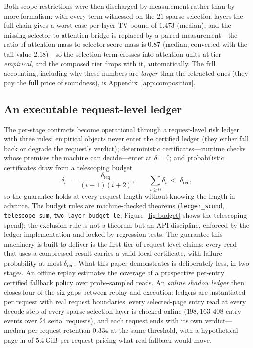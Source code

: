 \documentclass[11pt]{article}
\begin{document}
Both scope restrictions were then discharged by measurement rather than
by more formalism: with every term witnessed on the $21$ sparse-selection
layers the full chain gives a worst-case per-layer TV bound of $1.473$
(median), and the missing selector-to-attention bridge is replaced by a
paired measurement---the ratio of attention mass to selector-score mass is
$0.87$ (median; converted with the tail value $2.18$)---so the selection
term crosses into attention units at tier \emph{empirical}, and the
composed tier drops with it, automatically. The full accounting, including
why these numbers are \emph{larger} than the retracted ones (they pay the
full price of soundness), is Appendix~\ref{app:composition}.

\subsection{An executable request-level ledger}\label{sec:ledger}
The per-stage contracts become operational through a request-level risk ledger with
three rules: empirical objects never enter the certified ledger (they either fall
back or degrade the request's verdict); deterministic certificates---runtime
checks whose premises the machine can decide---enter at $\delta=0$; and
probabilistic certificates draw from a telescoping budget
\begin{equation}
\delta_i \;=\; \frac{\delta_{\mathrm{req}}}{(i{+}1)(i{+}2)},
\qquad \sum_{i\ge 0}\delta_i \;<\; \delta_{\mathrm{req}},
\label{eq:telescope}
\end{equation}
so the guarantee holds at every request length without knowing the
length in advance. The budget rules are machine-checked
theorems (\texttt{ledger\_sound}, \texttt{telescope\_sum},
\texttt{two\_layer\_budget\_le}; Figure~\ref{fig:budget} shows the
telescoping spend); the exclusion rule is not a theorem but an API
discipline, enforced by the ledger implementation and locked by regression tests. The guarantee this machinery is built to deliver is the first tier of
request-level claims: every read that uses a compressed result carries a valid
local certificate, with failure probability at most $\delta_{\mathrm{req}}$. What
this paper demonstrates is deliberately less, in two stages. An offline replay
estimates the coverage of a prospective per-entry certified fallback policy over
probe-sampled reads. An \emph{online shadow ledger} then closes four of the six
gaps between replay and execution: ledgers are instantiated per request with real
request boundaries, every selected-page entry read at every decode step of every
sparse-selection layer is checked online ($198{,}163{,}408$ entry events over
$24$ serial requests), and each request ends with its own verdict---median
per-request retention $0.334$ at the same threshold, with a hypothetical
page-in of $5.4$\,GiB per request pricing what real fallback would move.
\end{document}
